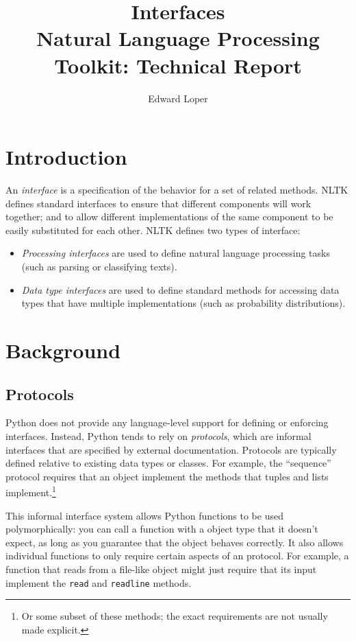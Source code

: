 \documentclass[11pt]{article}
\begin{document}
\title{Interfaces\\
\Large Natural Language Processing Toolkit: Technical Report}
\author{Edward Loper}
\maketitle

\section{Introduction}

An \textit{interface} is a specification of the behavior for a set of
related methods.  NLTK defines standard interfaces to ensure that
different components will work together; and to allow different
implementations of the same component to be easily substituted for
each other.  NLTK defines two types of interface:

\begin{itemize}
\item \textit{Processing interfaces} are used to define natural
  language processing tasks (such as parsing or classifying texts).
\item \textit{Data type interfaces} are used to define standard
  methods for accessing data types that have multiple implementations
  (such as probability distributions).
\end{itemize}

\section{Background}
\subsection{Protocols}

Python does not provide any language-level support for defining or
enforcing interfaces.  Instead, Python tends to rely on
\textit{protocols}, which are informal interfaces that are specified
by external documentation.  Protocols are typically defined relative
to existing data types or classes.  For example, the ``sequence''
protocol requires that an object implement the methods that tuples and
lists implement.\footnote{Or some subset of these methods; the exact
  requirements are not usually made explicit.}

This informal interface system allows Python functions to be used
polymorphically: you can call a function with a object type that it
doesn't expect, as long as you guarantee that the object behaves
correctly.  It also allows individual functions to only require
certain aspects of an protocol.  For example, a function that reads from
a file-like object might just require that its input implement the
\texttt{read} and \texttt{readline} methods.
\end{document}
